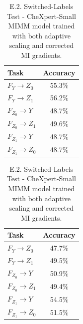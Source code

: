 \documentclass[12pt,DIV14,BCOR12mm,a4paper,footinclude=false,headinclude,parskip=half-,twoside,openright,cleardoublepage=empty,toc=index,bibliography=totoc,listof=totoc]{scrreprt}
\numberwithin{equation}{chapter}
\begin{document}
\begin{table}[H]
\centering
\begin{minipage}{.45\linewidth}
\centering
\begin{tabular}{|l|c|}
\hline
\textbf{Task} & \textbf{Accuracy} \\
\hline
$F_Y \rightarrow Z_0$ & 55.3\% \\
$F_Y \rightarrow Z_1$ & 56.2\% \\
\hline
$F_{Z_0} \rightarrow Y$ & 48.7\% \\
$F_{Z_0} \rightarrow Z_1$ & 49.6\% \\
\hline
$F_{Z_1} \rightarrow Y$ & 48.7\% \\
$F_{Z_1} \rightarrow Z_0$ & 48.7\% \\
\hline
\end{tabular}
\caption{E.1. Switched-Labels Test - CheXpert-Small MIMM model trained without adaptive scaling and corrected MI gradients.}
\label{tab:accuracy_tasks-chxMIMM_noada_nocorr}
\end{minipage}%
\hfill
\begin{minipage}{.45\linewidth}
\centering
\begin{tabular}{|l|c|}
\hline
\textbf{Task} & \textbf{Accuracy} \\
\hline
$F_Y \rightarrow Z_0$ & 47.7\% \\
$F_Y \rightarrow Z_1$ & 49.5\% \\
\hline
$F_{Z_0} \rightarrow Y$ & 50.9\% \\
$F_{Z_0} \rightarrow Z_1$ & 49.4\% \\
\hline
$F_{Z_1} \rightarrow Y$ & 54.5\% \\
$F_{Z_1} \rightarrow Z_0$ & 51.5\% \\
\hline
\end{tabular}
\caption{E.2. Switched-Labels Test - CheXpert-Small MIMM model trained with both adaptive scaling and corrected MI gradients.}
\label{tab:accuracy_tasks-chxMIMM_ada_corr}
\end{minipage}%
\end{table}

\vspace{-2.5cm}
\end{document}
